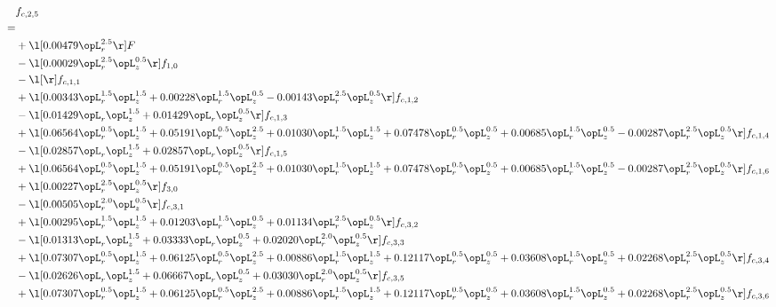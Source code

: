 \begin{alignat}{2} 
\label{eq:f_25_1} 
& f_{c,2,5} \nonumber \\ 
 = \\ 
& + \l[  0.00479 \opL_r^{2.5}  \r] F \nonumber \\ 
& - \l[  0.00029 \opL_r^{2.5} \opL_z^{0.5}  \r] f_{1,0} \nonumber \\ 
& - \l[  \r] f_{c,1,1} \nonumber \\ 
& + \l[  0.00343 \opL_r^{1.5} \opL_z^{1.5} +  0.00228 \opL_r^{1.5} \opL_z^{0.5}   -0.00143 \opL_r^{2.5} \opL_z^{0.5}  \r] f_{c,1,2} \nonumber \\ 
& - \l[  0.01429 \opL_r \opL_z^{1.5} +  0.01429 \opL_r \opL_z^{0.5}  \r] f_{c,1,3} \nonumber \\ 
& + \l[  0.06564 \opL_r^{0.5} \opL_z^{1.5} +  0.05191 \opL_r^{0.5} \opL_z^{2.5} +  0.01030 \opL_r^{1.5} \opL_z^{1.5} +  0.07478 \opL_r^{0.5} \opL_z^{0.5} +  0.00685 \opL_r^{1.5} \opL_z^{0.5}   -0.00287 \opL_r^{2.5} \opL_z^{0.5}  \r] f_{c,1,4} \nonumber \\ 
& - \l[  0.02857 \opL_r \opL_z^{1.5} +  0.02857 \opL_r \opL_z^{0.5}  \r] f_{c,1,5} \nonumber \\ 
& + \l[  0.06564 \opL_r^{0.5} \opL_z^{1.5} +  0.05191 \opL_r^{0.5} \opL_z^{2.5} +  0.01030 \opL_r^{1.5} \opL_z^{1.5} +  0.07478 \opL_r^{0.5} \opL_z^{0.5} +  0.00685 \opL_r^{1.5} \opL_z^{0.5}   -0.00287 \opL_r^{2.5} \opL_z^{0.5}  \r] f_{c,1,6} \nonumber \\ 
& + \l[  0.00227 \opL_r^{2.5} \opL_z^{0.5}  \r] f_{3,0} \nonumber \\ 
& - \l[  0.00505 \opL_r^{2.0} \opL_z^{0.5}  \r] f_{c,3,1} \nonumber \\ 
& + \l[  0.00295 \opL_r^{1.5} \opL_z^{1.5} +  0.01203 \opL_r^{1.5} \opL_z^{0.5} +  0.01134 \opL_r^{2.5} \opL_z^{0.5}  \r] f_{c,3,2} \nonumber \\ 
& - \l[  0.01313 \opL_r \opL_z^{1.5} +  0.03333 \opL_r \opL_z^{0.5} +  0.02020 \opL_r^{2.0} \opL_z^{0.5}  \r] f_{c,3,3} \nonumber \\ 
& + \l[  0.07307 \opL_r^{0.5} \opL_z^{1.5} +  0.06125 \opL_r^{0.5} \opL_z^{2.5} +  0.00886 \opL_r^{1.5} \opL_z^{1.5} +  0.12117 \opL_r^{0.5} \opL_z^{0.5} +  0.03608 \opL_r^{1.5} \opL_z^{0.5} +  0.02268 \opL_r^{2.5} \opL_z^{0.5}  \r] f_{c,3,4} \nonumber \\ 
& - \l[  0.02626 \opL_r \opL_z^{1.5} +  0.06667 \opL_r \opL_z^{0.5} +  0.03030 \opL_r^{2.0} \opL_z^{0.5}  \r] f_{c,3,5} \nonumber \\ 
& + \l[  0.07307 \opL_r^{0.5} \opL_z^{1.5} +  0.06125 \opL_r^{0.5} \opL_z^{2.5} +  0.00886 \opL_r^{1.5} \opL_z^{1.5} +  0.12117 \opL_r^{0.5} \opL_z^{0.5} +  0.03608 \opL_r^{1.5} \opL_z^{0.5} +  0.02268 \opL_r^{2.5} \opL_z^{0.5}  \r] f_{c,3,6} \nonumber \\ 

\end{alignat}

